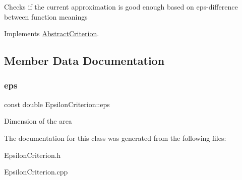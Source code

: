 Checks if the current approximation is good enough based on eps-\/difference between function meanings 

Implements \hyperlink{class_abstract_criterion_aa38fc5fe24aabd2b925509961eb017df}{Abstract\+Criterion}.



\subsection{Member Data Documentation}
\mbox{\label{class_epsilon_criterion_aa681adfcb498dadf5f2a5857940d535f}} 
\subsubsection{\texorpdfstring{eps}{eps}}
{\footnotesize\ttfamily const double Epsilon\+Criterion\+::eps\hspace{0.3cm}{\ttfamily [private]}}

Dimension of the area 

The documentation for this class was generated from the following files\+:\begin{DoxyCompactItemize}
\item 
Epsilon\+Criterion.\+h\item 
Epsilon\+Criterion.\+cpp\end{DoxyCompactItemize}
